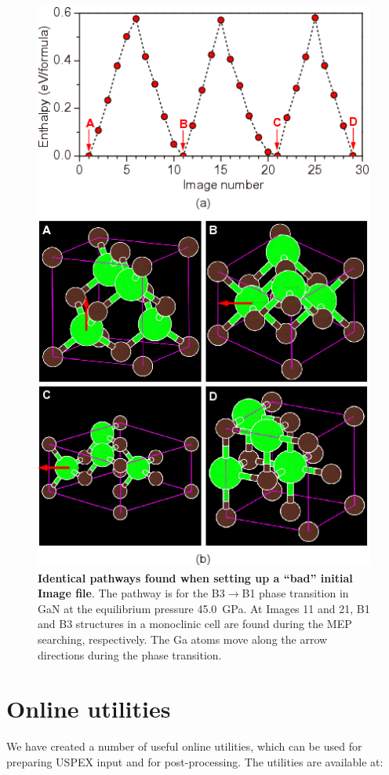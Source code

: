 \documentclass[12pt]{article}
\begin{document}
\begin{figure}[htbp] \centering
\includegraphics[scale=0.8]{pic/VCNEB_pathway}
\caption{\footnotesize \textbf{Identical pathways found when setting up a
``bad'' initial Image file}. The pathway is for the B3$\rightarrow$B1 phase
transition in GaN at the equilibrium pressure 45.0~GPa. At Images 11 and 21, B1
and B3 structures in a monoclinic cell are found during the MEP searching,
respectively. The Ga atoms move along the arrow directions during the phase
transition.}
\label{fig:VCNEB_pathway}
\end{figure}


\newpage
\section{Online utilities} \label{utilities}
We have created a number of useful online utilities, which can be used for
preparing USPEX input and for post-processing. The utilities are available at:
\end{document}
